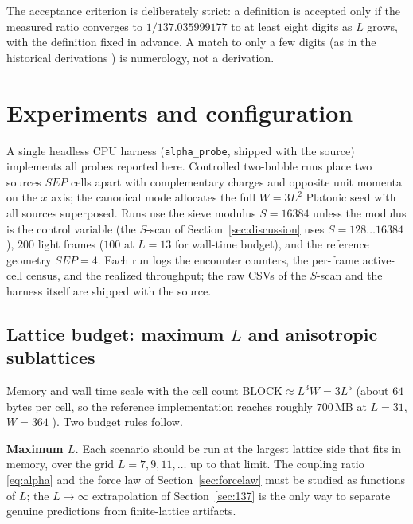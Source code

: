 \documentclass[11pt,a4paper]{article}
\begin{document}
The acceptance criterion is deliberately strict: a definition is accepted
only if the measured ratio converges to $1/137.035999177$ to at least eight
digits as $L$ grows, with the definition fixed in advance. A match to only a
few digits (as in the historical derivations \cite{kragh2003,good1990}) is
numerology, not a derivation.

\section{Experiments and configuration}
\label{sec:experiments}

A single headless CPU harness (\texttt{alpha\_probe}, shipped with the source)
implements all probes reported here. Controlled two-bubble runs place two
sources $SEP$ cells apart with complementary charges and opposite unit momenta
on the $x$ axis; the canonical mode allocates the full $W=3L^2$ Platonic seed
with all sources superposed. Runs use the sieve modulus $S=16384$ unless the
modulus is the control variable (the $S$-scan of Section~\ref{sec:discussion}
uses $S=128\ldots16384$), $200$ light frames ($100$ at $L=13$ for wall-time
budget), and the reference geometry $SEP=4$. Each run logs the encounter
counters, the per-frame active-cell census, and the realized throughput; the
raw CSVs of the $S$-scan and the harness itself are shipped with the source.

\subsection{Lattice budget: maximum \texorpdfstring{$L$}{L} and anisotropic
sublattices}
\label{sec:sublattice}

Memory and wall time scale with the cell count
$\mathrm{BLOCK}\approx L^3 W = 3L^5$ (about $64$ bytes per cell, so the
reference implementation reaches roughly $700\,\mathrm{MB}$ at $L=31$,
$W=364$ \cite{itfrombit}). Two budget rules follow.

\textbf{Maximum $L$.} Each scenario should be run at the largest lattice side
that fits in memory, over the grid $L=7,9,11,\dots$ up to that limit. The
coupling ratio \eqref{eq:alpha} and the force law of
Section~\ref{sec:forcelaw} must be studied as functions of $L$; the
$L\to\infty$ extrapolation of Section~\ref{sec:137} is the only way to
separate genuine predictions from finite-lattice artifacts.
\end{document}
